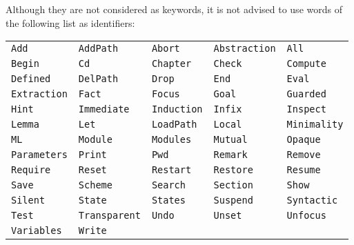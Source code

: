 Although they are not considered as keywords, it is not advised to use
words of the following list as identifiers:
\begin{center}
\begin{tabular}{lllll}
\verb!Add!        &
\verb!AddPath!    &
\verb!Abort!      &
\verb!Abstraction!&
\verb!All!        \\
\verb!Begin!      &
\verb!Cd!         &
\verb!Chapter!    &
\verb!Check!      &
\verb!Compute!    \\
\verb!Defined!    &
\verb!DelPath!    &
\verb!Drop!       &
\verb!End!        &
\verb!Eval!       \\
\verb!Extraction! &
\verb!Fact!       &
\verb!Focus!      &
\verb!Goal!       &
\verb!Guarded!    \\
\verb!Hint!       &
\verb!Immediate!  &
\verb!Induction!  &
\verb!Infix!      &
\verb!Inspect!    \\
\verb!Lemma!      &
\verb!Let!        &
\verb!LoadPath!   &
\verb!Local!      &
\verb!Minimality! \\
\verb!ML!         &
\verb!Module!     &
\verb!Modules!    &
\verb!Mutual!     &
\verb!Opaque!     \\
\verb!Parameters! &
\verb!Print!      &
\verb!Pwd!        &
\verb!Remark!     &
\verb!Remove!     \\
\verb!Require!    &
\verb!Reset!      &
\verb!Restart!    &
\verb!Restore!    &
\verb!Resume!     \\
\verb!Save!       &
\verb!Scheme!     &
\verb!Search!     &
\verb!Section!    &
\verb!Show!       \\
\verb!Silent!     &
\verb!State!      &
\verb!States!     &
\verb!Suspend!    &
\verb!Syntactic!  \\
\verb!Test!       &
\verb!Transparent!&
\verb!Undo!       &
\verb!Unset!      &
\verb!Unfocus!    \\
\verb!Variables!  &
\verb!Write!      & & &
\end{tabular}
\end{center}

